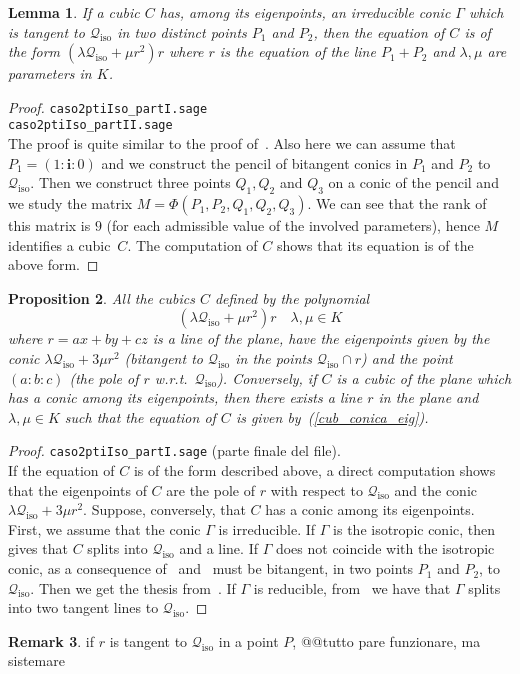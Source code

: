 \documentclass{amsart}
\theoremstyle{plain}
\newtheorem{lemma}{Lemma}[section]
\newtheorem{prop}[lemma]{Proposition}
\theoremstyle{definition}
\newtheorem{rmk}[lemma]{Remark}
\newcommand{\iso}{\mathcal{Q}_{\mathrm{iso}}}
\newcommand{\iii}{\textbf{i}}
\begin{document}
\begin{lemma}
\label{lemma:bitangentToCiso}
If a cubic $C$ has, among its eigenpoints, an irreducible conic $\Gamma$
which is tangent to $\iso$ in two distinct points $P_1$ and $P_2$, then
the equation of $C$ is of the form $(\lambda \iso + \mu r^2)r$ where
$r$ is the equation of the line $P_1+P_2$ and $\lambda, \mu$ are parameters
in $K$.
\end{lemma}
\begin{proof}
\verb+caso2ptiIso_partI.sage+\\
\verb+caso2ptiIso_partII.sage+\\
The proof is quite similar to the proof of~. Also
here we can assume that $P_1 = (1: \iii: 0)$ and we construct the pencil of
bitangent conics in $P_1$ and $P_2$ to $\iso$. Then we construct three
points $Q_1, Q_2$ and $Q_3$ on a conic of the pencil
and we study the matrix $M = \Phi(P_1, P_2, Q_1, Q_2, Q_3)$. We can see
that the rank of this matrix is $9$ (for each admissible value of the
involved parameters), hence $M$ identifies a cubic~$C$. The computation
of $C$ shows that its equation is of the above form.
\end{proof}


\begin{prop} All the cubics $C$ defined by the polynomial
\begin{equation}
\label{cub_conica_eig}
(\lambda \iso + \mu r^2)r \quad \mbox{$\lambda, \mu \in K$}
\end{equation}
where $r=ax+by+cz$ is a line of the plane,
have the eigenpoints given by the conic
$\lambda \iso+3\mu r^2$ (bitangent to $\iso$ in the points $\iso \cap r$)
and the point $(a:b:c)$ (the pole of $r$
w.r.t.\ $\iso$). Conversely, if
$C$ is a cubic of the plane which has a conic among its eigenpoints,
then there exists a line $r$ in the plane and $\lambda, \mu \in K$
such that the equation of
$C$ is given by~(\ref{cub_conica_eig}).
\end{prop}
\begin{proof}
\verb+caso2ptiIso_partI.sage+ (parte finale del file).\\
If the equation of $C$ is of the form described above, a direct computation
shows that the eigenpoints of $C$ are the pole of $r$ with respect to $\iso$
and the conic $\lambda \iso+3\mu r^2$. Suppose, conversely, that $C$ has
a conic among its eigenpoints. First, we assume that the conic $\Gamma$
is irreducible. If $\Gamma$ is the isotropic conic,
then~ gives that $C$ splits into $\iso$ and a line.
If $\Gamma$ does not coincide with the
isotropic conic, as a consequence
of~ and~ must be bitangent,
in two points $P_1$ and $P_2$, to $\iso$. Then we get the thesis
from~. If $\Gamma$ is reducible,
from~  we have that $\Gamma$ splits
into two tangent lines to $\iso$.
\end{proof}
\begin{rmk}
if $r$ is tangent to $\iso$ in a point $P$, @@tutto pare funzionare,
ma sistemare
\end{rmk}
\end{document}

